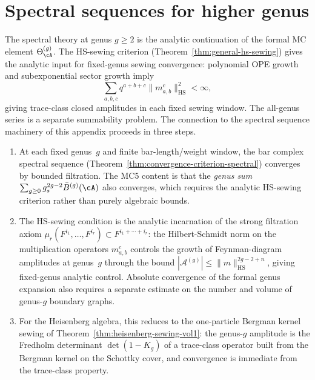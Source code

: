 
\section{Spectral sequences for higher genus}

\begin{construction}
\label{constr:spectral-mc5}
The spectral theory at genus $g \geq 2$ is the analytic
continuation of the formal MC element
$\Theta_\cA^{(g)}$. The HS-sewing criterion
(Theorem~\ref{thm:general-hs-sewing}) gives the analytic input for
fixed-genus sewing convergence:
polynomial OPE growth and subexponential sector growth imply
\[
\sum_{a,b,c} q^{a+b+c}
\|m^c_{a,b}\|^2_{\mathrm{HS}} < \infty,
\]
giving trace-class closed amplitudes in each fixed sewing window. The
all-genus series is a separate summability problem.
The connection to the spectral sequence machinery of this
appendix proceeds in three steps.
\begin{enumerate}[label=\textup{(\roman*)}]
\item At each fixed genus~$g$ and finite bar-length/weight window, the
 bar complex spectral sequence
 (Theorem~\ref{thm:convergence-criterion-spectral})
 converges by bounded filtration. The MC5 content is
 that the \emph{genus sum}
 $\sum_{g \geq 0} g_s^{2g-2} \bar{B}^{(g)}(\cA)$
 also converges, which requires the analytic HS-sewing
 criterion rather than purely algebraic bounds.
\item The HS-sewing condition is the analytic incarnation
 of the strong filtration axiom
 $\mu_r(F^{i_1}, \ldots, F^{i_r})
 \subset F^{i_1 + \cdots + i_r}$: the Hilbert-Schmidt
 norm on the multiplication operators $m^c_{a,b}$
 controls the growth of Feynman-diagram amplitudes
 at genus~$g$ through the bound
 $|\mathcal{A}^{(g)}| \leq
 \|m\|_{\mathrm{HS}}^{2g-2+n}$,
 giving fixed-genus analytic control. Absolute convergence of the
 formal genus expansion also requires a separate estimate on the number
 and volume of genus-$g$ boundary graphs.
\item For the Heisenberg algebra, this reduces to the
 one-particle Bergman kernel sewing of
 Theorem~\ref{thm:heisenberg-sewing-vol1}: the genus-$g$
 amplitude is the Fredholm determinant
 $\det(1 - K_g)$ of a trace-class operator built
 from the Bergman kernel on the Schottky cover, and
 convergence is immediate from the trace-class
 property.
\end{enumerate}
\end{construction}

